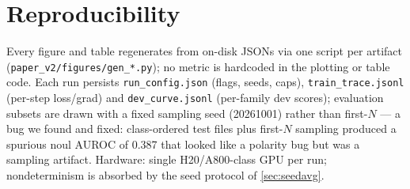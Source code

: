 \section{Reproducibility}
\label{app:repro}

Every figure and table regenerates from on-disk JSONs via one script per artifact
(\texttt{paper\_v2/figures/gen\_*.py}); no metric is hardcoded in the plotting or table
code. Each run persists \texttt{run\_config.json} (flags, seeds, caps),
\texttt{train\_trace.jsonl} (per-step loss/grad) and \texttt{dev\_curve.jsonl} (per-family
dev scores); evaluation subsets are drawn with a fixed sampling seed (20261001) rather than
first-$N$ --- a bug we found and fixed: class-ordered test files plus first-$N$ sampling
produced a spurious noul AUROC of 0.387 that looked like a polarity bug but was a sampling
artifact. Hardware: single H20/A800-class GPU per run; nondeterminism is absorbed by the
seed protocol of \cref{sec:seedavg}.
